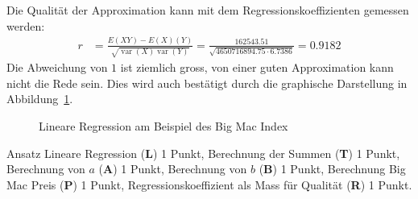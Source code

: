 \begin{loesung}
\begin{teilaufgaben}
\item
Die Qualität der Approximation kann mit dem Regressionskoeffizienten
gemessen werden:
\begin{align*}
r
&=
\frac{E(XY)-E(X)(Y)}{\sqrt{\operatorname{var}(X)\operatorname{var}(Y)}}
=\frac{162543.51}{\sqrt{
4650716894.75
\cdot
6.7386
}}
=0.9182
\end{align*}
Die Abweichung von $1$ ist ziemlich gross, von einer guten Approximation
kann nicht die Rede sein.
Dies wird auch bestätigt durch die graphische Darstellung in
Abbildung~\ref{40000037:lin}.
\begin{figure}
\centering
{}
\caption{Lineare Regression am Beispiel des Big Mac Index
\label{40000037:lin}}
\end{figure}
\qedhere
\end{teilaufgaben}
\end{loesung}

\begin{bewertung}
Ansatz Lineare Regression ({\bf L}) 1 Punkt,
Berechnung der Summen ({\bf T}) 1 Punkt,
Berechnung von $a$ ({\bf A}) 1 Punkt,
Berechnung von $b$ ({\bf B}) 1 Punkt,
Berechnung Big Mac Preis ({\bf P}) 1 Punkt,
Regressionskoeffizient als Mass für Qualität ({\bf R}) 1 Punkt.
\end{bewertung}



